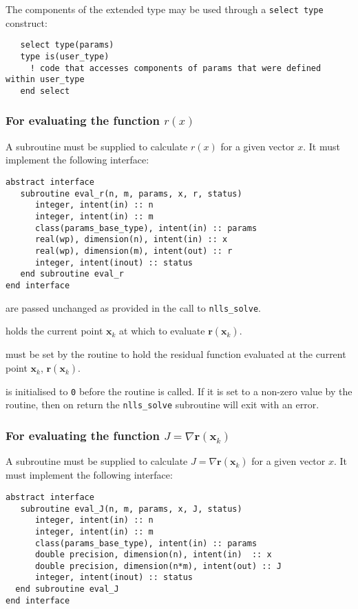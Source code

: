 \documentclass{spec}
\newcommand{\vx}{ {\bm x} } %
\newcommand{\vr}{ {\bm r} } %
\newcommand{\iter}[2][k]{ #2_{#1}^{}} %
\begin{document}
The components of the extended type may be used through a \texttt{select type}
construct:
\begin{verbatim}
   select type(params)
   type is(user_type)
     ! code that accesses components of params that were defined within user_type 
   end select
\end{verbatim}

\subsubsection{For evaluating the function $r(x)$}
A subroutine must be supplied to calculate $r(x)$ for a given vector $x$. It
must implement the following interface:

\begin{verbatim}
abstract interface
   subroutine eval_r(n, m, params, x, r, status)
      integer, intent(in) :: n
      integer, intent(in) :: m
      class(params_base_type), intent(in) :: params
      real(wp), dimension(n), intent(in) :: x
      real(wp), dimension(m), intent(out) :: r
      integer, intent(inout) :: status
   end subroutine eval_r
end interface
\end{verbatim}

\begin{description}
    are passed unchanged as provided in the call to
      {\tt nlls\_solve}.

       holds the current point $\iter{\vx}$ at which to evaluate $\vr(\iter{\vx})$.
  
    must be set by the routine to hold the residual function 
      evaluated at the current point $\iter{\vx}$, $\vr(\iter{\vx})$.

    is initialised to \texttt{0} before the routine is
      called. If it is set to a non-zero value by the routine, then on return
      the {\tt nlls\_solve} subroutine will exit with an error.
\end{description}

\subsubsection{For evaluating the function $J = \nabla \vr(\iter{\vx})$}
A subroutine must be supplied to calculate $J = \nabla \vr(\iter{\vx})$ for a given vector $x$. It
must implement the following interface:

\begin{verbatim}
abstract interface
   subroutine eval_J(n, m, params, x, J, status)
      integer, intent(in) :: n
      integer, intent(in) :: m
      class(params_base_type), intent(in) :: params
      double precision, dimension(n), intent(in)  :: x
      double precision, dimension(n*m), intent(out) :: J
      integer, intent(inout) :: status
  end subroutine eval_J
end interface
\end{verbatim}
\end{document}
